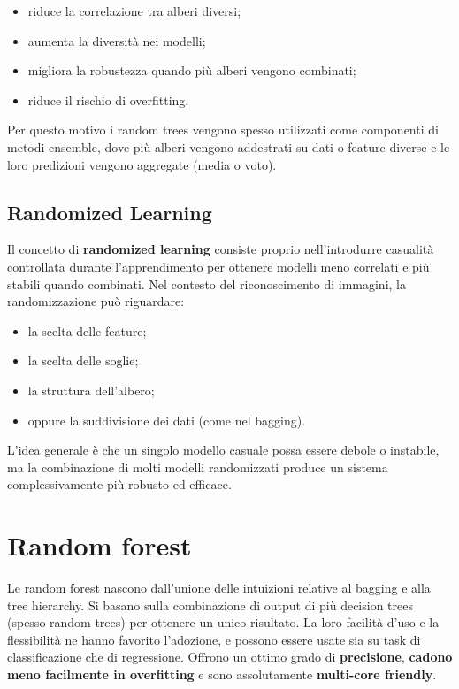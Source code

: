 \begin{itemize}
    \item riduce la correlazione tra alberi diversi;
    \item aumenta la diversità nei modelli;
    \item migliora la robustezza quando più alberi vengono combinati;
    \item riduce il rischio di overfitting.
\end{itemize}

Per questo motivo i random trees vengono spesso utilizzati come componenti di metodi ensemble, dove più alberi vengono addestrati su dati o feature diverse e le loro predizioni vengono aggregate (media o voto).

\subsection{Randomized Learning}

Il concetto di \textbf{randomized learning} consiste proprio nell’introdurre casualità controllata durante l’apprendimento per ottenere modelli meno correlati e più stabili quando combinati. Nel contesto del riconoscimento di immagini, la randomizzazione può riguardare:
\begin{itemize}
    \item la scelta delle feature;
    \item la scelta delle soglie;
    \item la struttura dell’albero;
    \item oppure la suddivisione dei dati (come nel bagging).
\end{itemize}

L’idea generale è che un singolo modello casuale possa essere debole o instabile, ma la combinazione di molti modelli randomizzati produce un sistema complessivamente più robusto ed efficace.

\section{Random forest}
Le random forest nascono dall'unione delle intuizioni relative al bagging e alla tree hierarchy. Si basano sulla combinazione di output di più decision trees (spesso random trees) per ottenere un unico risultato. La loro facilità d'uso e la  flessibilità ne hanno favorito l'adozione, e possono essere usate sia su task di classificazione che di regressione.  Offrono un ottimo grado di \textbf{precisione}, \textbf{cadono meno facilmente in overfitting} e sono assolutamente \textbf{multi-core friendly}.

